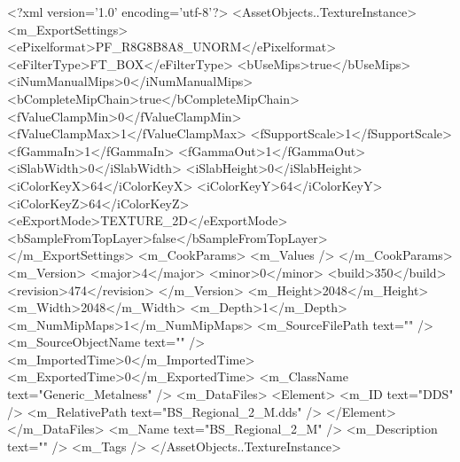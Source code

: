 <?xml version='1.0' encoding='utf-8'?>
<AssetObjects..TextureInstance>
  <m_ExportSettings>
    <ePixelformat>PF_R8G8B8A8_UNORM</ePixelformat>
    <eFilterType>FT_BOX</eFilterType>
    <bUseMips>true</bUseMips>
    <iNumManualMips>0</iNumManualMips>
    <bCompleteMipChain>true</bCompleteMipChain>
    <fValueClampMin>0</fValueClampMin>
    <fValueClampMax>1</fValueClampMax>
    <fSupportScale>1</fSupportScale>
    <fGammaIn>1</fGammaIn>
    <fGammaOut>1</fGammaOut>
    <iSlabWidth>0</iSlabWidth>
    <iSlabHeight>0</iSlabHeight>
    <iColorKeyX>64</iColorKeyX>
    <iColorKeyY>64</iColorKeyY>
    <iColorKeyZ>64</iColorKeyZ>
    <eExportMode>TEXTURE_2D</eExportMode>
    <bSampleFromTopLayer>false</bSampleFromTopLayer>
  </m_ExportSettings>
  <m_CookParams>
    <m_Values />
  </m_CookParams>
  <m_Version>
    <major>4</major>
    <minor>0</minor>
    <build>350</build>
    <revision>474</revision>
  </m_Version>
  <m_Height>2048</m_Height>
  <m_Width>2048</m_Width>
  <m_Depth>1</m_Depth>
  <m_NumMipMaps>1</m_NumMipMaps>
  <m_SourceFilePath text="" />
  <m_SourceObjectName text="" />
  <m_ImportedTime>0</m_ImportedTime>
  <m_ExportedTime>0</m_ExportedTime>
  <m_ClassName text="Generic_Metalness" />
  <m_DataFiles>
    <Element>
      <m_ID text="DDS" />
      <m_RelativePath text="BS_Regional_2_M.dds" />
    </Element>
  </m_DataFiles>
  <m_Name text="BS_Regional_2_M" />
  <m_Description text="" />
  <m_Tags />
</AssetObjects..TextureInstance>